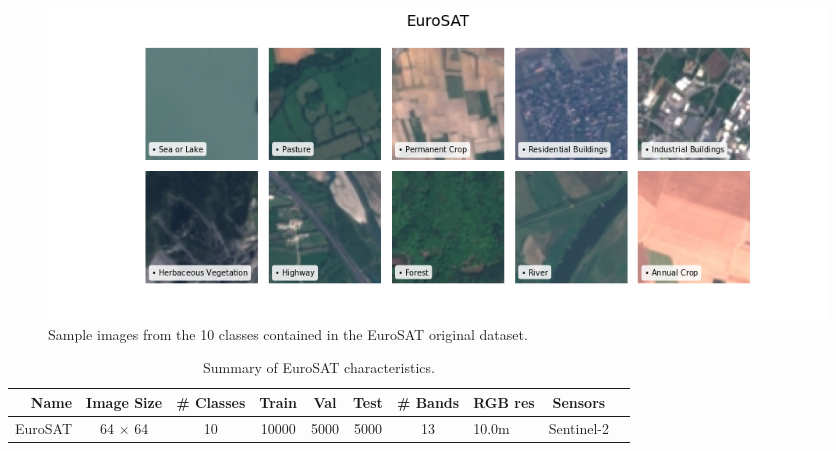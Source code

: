 \documentclass[a4paper, twoside, english]{sapthesis} %
\begin{document}
\vspace{0.5cm}

\begin{figure}[h]
    \centering
    \includegraphics[width=\textwidth]{img/EuroSAT_image_grid.png}
    \caption{\normalsize Sample images from the 10 classes contained in the EuroSAT original dataset.}
    \label{fig:eurosatgrid}
    \vspace{0.5cm}
\end{figure}


\begin{table}[h]
\centering
\footnotesize
\renewcommand{\arraystretch}{1.2}
    \begin{tabular}{rcccccclcl}
    \toprule
    Name & Image Size & \# Classes & Train & Val & Test & \# Bands & RGB res & Sensors  \\
    \midrule
    EuroSAT & 64 $\times$ 64 & 10 & 10000 & 5000 & 5000 & 13 & 10.0m & Sentinel-2 \\
    \bottomrule
    \end{tabular}
\vspace{0.3cm}
\caption{\normalsize Summary of EuroSAT characteristics.}
\label{tab:euclasstypes}
\end{table}
\end{document}
